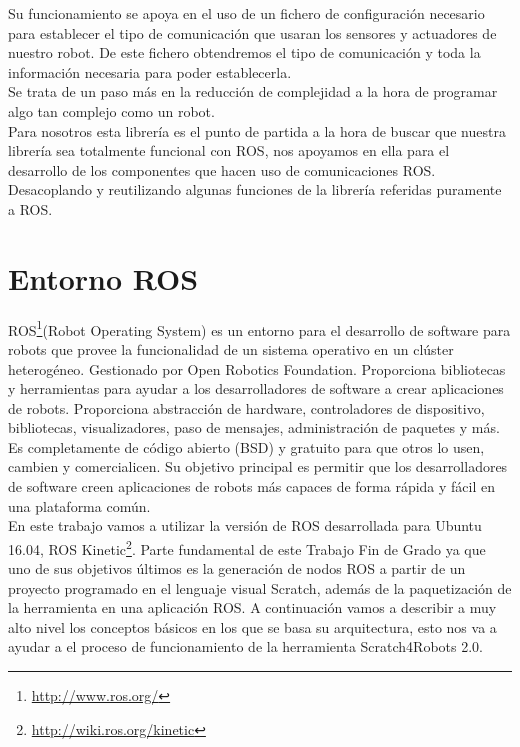 Su funcionamiento se apoya en el uso de un fichero de configuración necesario para establecer el tipo de comunicación que usaran los sensores y actuadores de nuestro robot. De este fichero obtendremos el tipo de comunicación y toda la información necesaria para poder establecerla. \\

Se trata de un paso más en la reducción de complejidad a la hora de programar algo tan complejo como un robot.\\

Para nosotros esta librería es el punto de partida a la hora de buscar que nuestra librería sea totalmente funcional con ROS, nos apoyamos en ella para el desarrollo de los componentes que hacen uso de comunicaciones ROS. Desacoplando y reutilizando algunas funciones de la librería referidas puramente a ROS.


\section{Entorno ROS}
\label{sec:ros}
ROS\footnote{\url{http://www.ros.org/}}(Robot Operating System) es un entorno para el desarrollo de software para robots que provee la funcionalidad de un sistema operativo en un clúster heterogéneo. Gestionado por Open Robotics Foundation. Proporciona bibliotecas y herramientas para ayudar a los desarrolladores de software a crear aplicaciones de robots. Proporciona abstracción de hardware, controladores de dispositivo, bibliotecas, visualizadores, paso de mensajes, administración de paquetes y más.\\

Es completamente de código abierto (BSD) y gratuito para que otros lo usen, cambien y comercialicen. Su objetivo principal es permitir que los desarrolladores de software creen aplicaciones de robots más capaces de forma rápida y fácil en una plataforma común. \\

En este trabajo vamos a utilizar la versión de ROS desarrollada para Ubuntu 16.04, ROS Kinetic\footnote{\url{http://wiki.ros.org/kinetic}}. Parte fundamental de este Trabajo Fin de Grado ya que uno de sus objetivos últimos es la generación de nodos ROS a partir de un proyecto programado en el lenguaje visual Scratch, además de la paquetización de la herramienta en una aplicación ROS. A continuación vamos a describir a muy alto nivel los conceptos básicos en los que se basa su arquitectura, esto nos va a ayudar a el proceso de funcionamiento de la herramienta Scratch4Robots 2.0.\\


